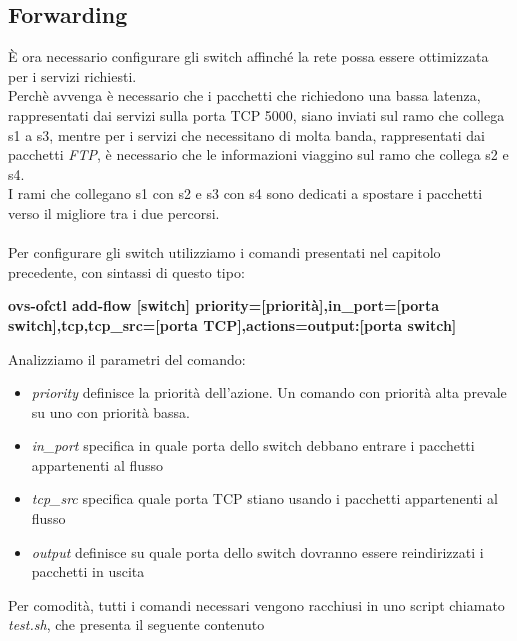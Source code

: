 \subsection{Forwarding}\label{ch:3.2.2}
È ora necessario configurare gli switch affinché la rete possa essere ottimizzata per i servizi richiesti.\\
Perchè avvenga è necessario che i pacchetti che richiedono una bassa latenza, rappresentati dai servizi sulla porta TCP 5000, siano inviati sul ramo che collega s1 a s3, mentre per i servizi che necessitano di molta banda, rappresentati dai pacchetti \textit{FTP}, è necessario che le informazioni viaggino sul ramo che collega s2 e s4.\\
I rami che collegano s1 con s2 e s3 con s4 sono dedicati a spostare i pacchetti verso il migliore tra i due percorsi.\\\\
Per configurare gli switch utilizziamo i comandi presentati nel capitolo precedente, con sintassi di questo tipo:\\
\begin{center}
	\textbf{ovs-ofctl add-flow [switch] priority=[priorità],in\_port=[porta switch],tcp,tcp\_src=[porta TCP],actions=output:[porta switch] }\\
\end{center}
Analizziamo il parametri del comando:\\
\begin{itemize}
	\item \textit{priority} definisce la priorità dell'azione. Un comando con priorità alta prevale su uno con priorità bassa.\\
	\item \textit{in\_port} specifica in quale porta dello switch debbano entrare i pacchetti appartenenti al flusso\\
	\item \textit{tcp\_src} specifica quale porta TCP stiano usando i pacchetti appartenenti al flusso\\
	\item \textit{output} definisce su quale porta dello switch dovranno essere reindirizzati i pacchetti in uscita\\
\end{itemize}
Per comodità, tutti i comandi necessari vengono racchiusi in uno script chiamato \textit{test.sh}, che presenta il seguente contenuto
